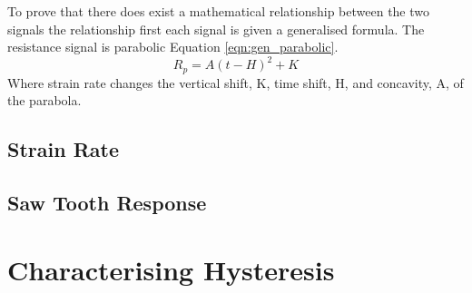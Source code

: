 To prove that there does exist a mathematical relationship between the two signals the relationship first each signal is given a generalised formula. The resistance signal is parabolic Equation \ref{eqn:gen_parabolic}. 
\begin{equation}
    R_p = A(t-H)^2 + K
    \label{eqn:gen_parabolic}
\end{equation}
Where strain rate changes the vertical shift, K, time shift, H, and concavity, A, of the parabola. 

\subsection{Strain Rate}


\subsection{Saw Tooth Response}


\section{Characterising Hysteresis}
